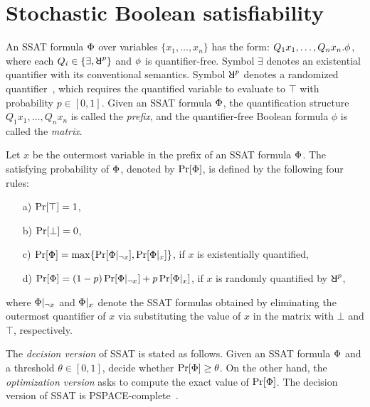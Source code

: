 \section{Stochastic Boolean satisfiability}
\label{sect:background-ssat}

An SSAT formula $\Phi$ over variables $\{x_1,\ldots,x_n\}$ has the form:
$Q_1x_1,\ldots,Q_nx_n.\phi$,
where each $Q_i\in\{\exists,\random{p}\}$ and $\phi$ is quantifier-free.
Symbol $\exists$ denotes an existential quantifier with its conventional semantics.
Symbol $\random{p}$ denotes a randomized quantifier~\cite{Papadimitriou1985}, which requires
the quantified variable to evaluate to $\top$ with probability $p\in[0,1]$.
Given an SSAT formula $\Phi$, the quantification structure $Q_1 x_1, \ldots, Q_n x_n$ is called the \emph{prefix},
and the quantifier-free Boolean formula $\phi$ is called the \emph{matrix}.

Let $x$ be the outermost variable in the prefix of an SSAT formula $\Phi$.
The satisfying probability of $\Phi$, denoted by $\Pr[\Phi]$, is defined by the following four rules:
\begin{enumerate}
    \item[a)] $\Pr[\top]=1$,
    \item[b)] $\Pr[\bot]=0$,
    \item[c)] $\Pr[\Phi]=\max\{\Pr[\Phi|_{\lnot x}],\Pr[\Phi|_{x}]\}$, if $x$ is existentially quantified,
    \item[d)] $\Pr[\Phi]=(1-p)\Pr[\Phi|_{\lnot x}]+p\Pr[\Phi|_{x}]$, if $x$ is randomly quantified by $\random{p}$,
\end{enumerate}
where $\Phi|_{\lnot x}$ and $\Phi|_{x}$ denote the SSAT formulas obtained by eliminating the outermost quantifier of $x$ via substituting the value of $x$ in the matrix with $\bot$ and $\top$, respectively.

The \textit{decision version} of SSAT is stated as follows.
Given an SSAT formula $\Phi$ and a threshold $\theta\in[0,1]$, decide whether $\Pr[\Phi]\geq\theta$.
On the other hand, the \textit{optimization version} asks to compute the exact value of $\Pr[\Phi]$.
The decision version of SSAT is PSPACE-complete~\cite{Papadimitriou1985}.